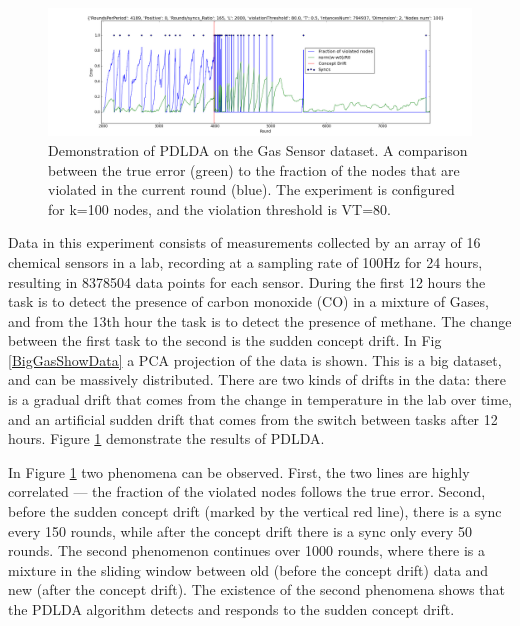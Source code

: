 \documentclass{sig-alternate-05-2015}
\begin{document}
\begin{figure}[ht!]
\centering
\includegraphics[width=\textwidth]{BigGas/overTime100k.png}
\caption{Demonstration of PDLDA on the Gas Sensor dataset. 
A comparison between the true error (green) to the fraction of the nodes that 
are violated in the current round (blue). 
The experiment is configured for k=100 nodes, and the violation threshold is
VT=80.}
\label{BigGasOverTime}
\end{figure}
Data in this experiment \cite{bigGas} consists of measurements collected
by an array of 16 chemical sensors in a lab, recording at a sampling
rate of 100Hz for 24 hours, resulting in 8378504 data points for each sensor. 
During the first 12 hours the task is to detect the presence of carbon monoxide
(CO) in a mixture of Gases, and from the 13th hour the task is to detect the presence of methane. 
The change between the first task to the second is the sudden concept drift.
In Fig \ref{BigGasShowData} a PCA projection of the data is shown.
This is a big dataset, and can be massively distributed. 
There are two kinds of drifts in the data: there is a gradual drift that comes from 
the change in temperature in the lab over time, and an
artificial sudden drift that comes from the switch between tasks after 12 hours.
Figure \ref{BigGasOverTime} demonstrate the results of PDLDA.

In Figure \ref{BigGasOverTime} two phenomena can be observed.
First, the two lines are highly correlated --- the fraction of the violated
nodes follows the true error. Second,  before the sudden concept drift 
(marked by the vertical red line), there is a sync every 150 rounds, while 
after the concept drift there is a sync only every 50 rounds.
The second phenomenon continues over 1000 rounds, where there is a mixture in the 
sliding window between old (before the concept drift) data and new 
(after the concept drift). The existence of the second phenomena shows that
the PDLDA algorithm detects and responds to the sudden concept drift.
\end{document}

